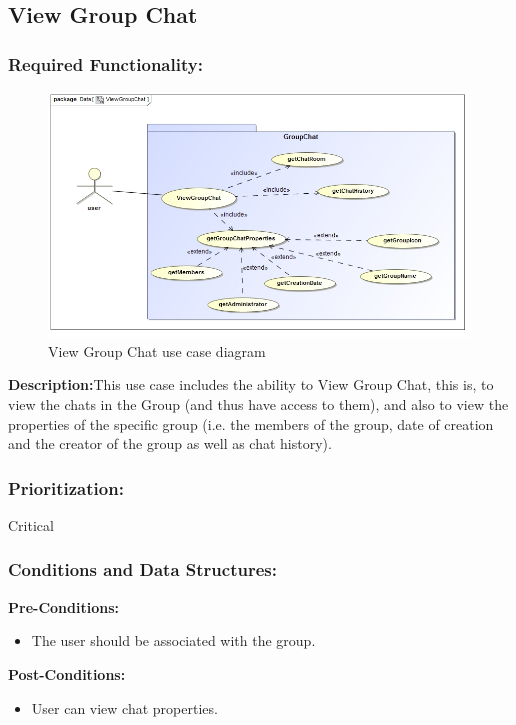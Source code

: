 \documentclass[a4paper]{article}
\begin{document}
\subsection{View Group Chat}

\subsubsection{Required Functionality:} 
\begin{figure}[H]
\includegraphics[width=1\linewidth]{./pictures/viewGroupChat.jpg}
\caption{View Group Chat use case diagram}
\end{figure}

\textbf{Description:}This use case includes the ability to View Group Chat, this is, to view the chats in the Group (and thus have access to them), and also to view the
properties of the specific group (i.e. the members of the group, date of creation and the creator of the group as well as chat history).

\subsubsection{Prioritization:} Critical

\subsubsection{Conditions and Data Structures:}
\textbf{Pre-Conditions:}
\begin{itemize}
	\item The user should be associated with the group. 
\end{itemize}
\textbf{Post-Conditions:}
\begin{itemize}
	\item User can view chat properties.
\end{itemize}
\end{document}
